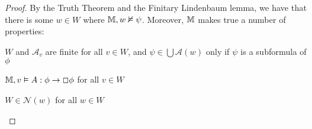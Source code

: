 \begin{proof}
  By the Truth Theorem and the Finitary Lindenbaum lemma, we have that
  there is some $w \in W$ where
  $\mathbbm{M}, w \nvDash \psi$.  Moreover, $\mathbbm{M}$ makes true a number of
  properties:
  \begin{enumeratenumeric}
    \item $W$ and $\mathcal{A}_v$ are finite for all $v \in W$, and $\psi \in
    \bigcup \mathcal{A}(w)$ only if $\psi$ is a subformula of $\phi$   
    \item $\mathbbm{M}, v \vDash A : \phi \rightarrow \Box \phi$ for all $v
    \in W$
    \item $W \in \mathcal{N}(w)$ for all $w \in W$
  \end{enumeratenumeric}
  
    
    
    
    
  

\end{proof}
